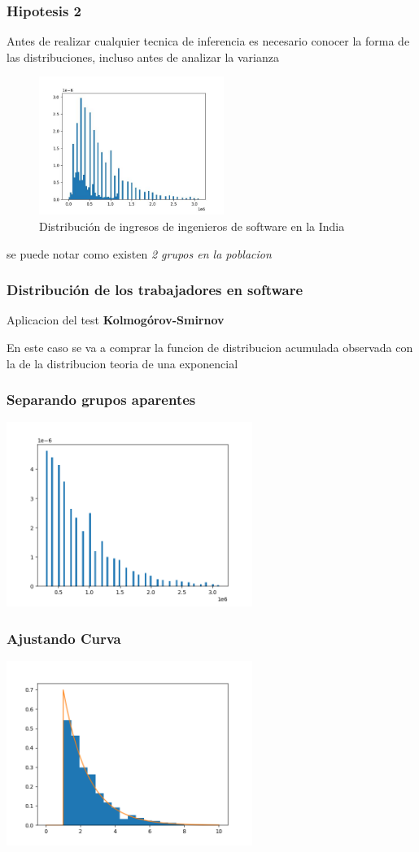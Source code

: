 \documentclass{beamer}
\begin{document}
\begin{frame}
\frametitle{Hipotesis 2}
  Antes de realizar cualquier tecnica de inferencia es necesario conocer
  la forma de las distribuciones, incluso antes de analizar la varianza

\begin{figure}[h]
  \caption{Distribución de ingresos de ingenieros de
  software en la India}
  \includegraphics[width=6cm]{distribucion_ingresos_sw.jpeg}
\end{figure}

  se puede notar como existen \textit{2 grupos en la poblacion}
\end{frame}

\begin{frame}
  \frametitle{Distribución de los trabajadores en software}
  \alert{Aplicacion del test \textbf{Kolmogórov-Smirnov}}

  En este caso se va a comprar la funcion de distribucion acumulada observada
  con la de la distribucion teoria de una exponencial

\end{frame}

\begin{frame}
  \frametitle{Separando grupos aparentes}
  \includegraphics[width=8cm]{procesado.png}

\end{frame}

\begin{frame}
  \frametitle{Ajustando Curva}
  \includegraphics[width=8cm]{hip2/ajustando_curva.png}

\end{frame}
\end{document}
